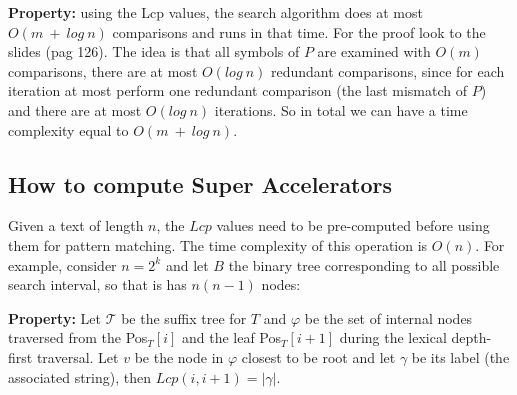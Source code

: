 \textbf{Property:} using the Lcp values, the search algorithm does at most $O(m~+~log~n)$ comparisons and runs in that time. For the proof look to the slides (pag 126).
The idea is that all symbols of $P$ are examined with $O(m)$ comparisons, there are at most $O(log~n)$ redundant comparisons, since for each iteration at most perform one redundant comparison (the last mismatch of $P$) and there are at most $O(log~n)$ iterations. So in total we can have a time complexity equal to $O(m~+~log~n)$.

\subsection{How to compute Super Accelerators}
Given a text of length $n$, the $Lcp$ values need to be pre-computed before using them for pattern matching. The time complexity of this operation is $O(n)$. For example, consider $n= 2^k$ and let $B$ the binary tree corresponding to all possible search interval, so that is has $n(n-1)$ nodes:

\textbf{Property:} Let $\mathcal{T}$ be the suffix tree for $T$ and $\varphi$ be the set of internal nodes traversed from the Pos$_T[i]$ and the leaf Pos$_T[i+1]$ during the lexical depth-first traversal. Let $v$ be the node in $\varphi$ closest to be root and let $\gamma$ be its label (the associated string), then $Lcp(i, i+1) = |\gamma|$.

